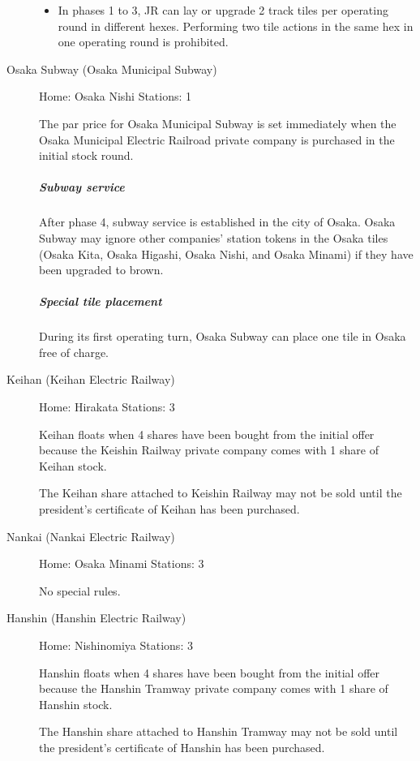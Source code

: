 \begin{multicols}{2}
\begin{description}
\begin{itemize}
\item In phases 1 to 3, JR can lay or upgrade 2 track tiles per
  operating round in different hexes. Performing two tile actions in
  the same hex in one operating round is prohibited.
\end{itemize}

\item[Osaka Subway (Osaka Municipal Subway)] \label{osaka-subway}

Home: Osaka Nishi \hfill Stations: 1

The par price for Osaka Municipal Subway is set immediately when the
Osaka Municipal Electric Railroad private company is purchased in the
initial stock round.

\subparagraph{Subway service}
After phase 4, subway service is established in the city of
Osaka. Osaka Subway may ignore other companies' station tokens in the
Osaka tiles (Osaka Kita, Osaka Higashi, Osaka Nishi, and Osaka Minami)
if they have been upgraded to brown.

\subparagraph{Special tile placement}
During its first operating turn, Osaka Subway can place one tile in
Osaka free of charge.

\item[Keihan (Keihan Electric Railway)]\hfill

Home: Hirakata \hfill Stations: 3

Keihan floats when 4 shares have been bought from the
initial offer because the Keishin Railway private company comes with
1 share of Keihan stock.

The Keihan share attached to Keishin Railway may not be sold until the
president's certificate of Keihan has been purchased.

\item[Nankai (Nankai Electric Railway)]\hfill

Home: Osaka Minami \hfill Stations: 3

No special rules.

\item[Hanshin (Hanshin Electric Railway)]\hfill

Home: Nishinomiya \hfill Stations: 3

Hanshin floats when 4 shares have been bought from the initial offer
because the Hanshin Tramway private company comes with 1 share of
Hanshin stock.

The Hanshin share attached to Hanshin Tramway may not be sold until
the president's certificate of Hanshin has been purchased.


\end{description}
\end{multicols}
